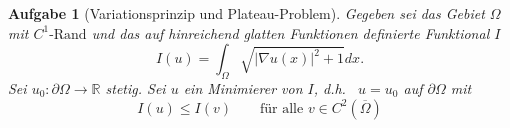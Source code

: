 \documentclass{scrartcl}
\newcommand{\abs}[1]{\left\lvert #1 \right\rvert}
\newcommand{\Rand}[1]{\partial #1}
\newcommand{\reals}{\mathbb{R}}
\newcommand{\closure}[1]{\overline{#1}}
\newtheorem {problem} {Aufgabe}
\theoremstyle{remark}
\begin{document}
\begin{problem}[Variationsprinzip und Plateau-Problem]
  Gegeben sei das Gebiet
  $\Omega$ mit
  $C^1\text{-Rand}$ und das auf hinreichend glatten Funktionen definierte Funktional $I$
  \begin{equation}
    I(u) = \int_{\Omega}
    \sqrt
    { \abs{ \nabla u (x) } ^ 2 + 1} d x.
  \end{equation}
  Sei $u_0 \colon \Rand{\Omega} \to
  \reals$ stetig.
  Sei $u$ ein Minimierer von $I$, d.h.\ 
  $u = u_0$ auf $\Rand {\Omega}$ mit
  \begin{equation}
    I(u) \leq I(v)
    \qquad
    \text{für alle } v
    \in
    C^2(\closure{\Omega})

\end{equation}
\end{problem}
\end{document}
